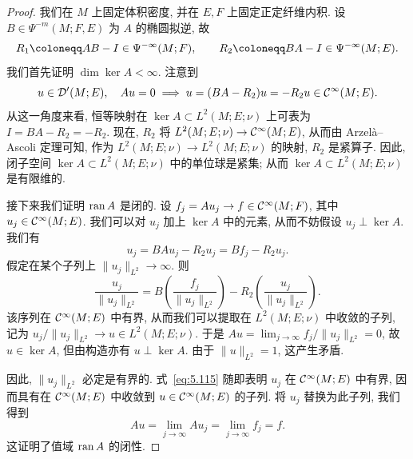 \begin{proof}
我们在 $M$ 上固定体积密度, 并在 $E, F$ 上固定正定纤维内积. 设 $B \in \Psi^{-m}(M; F, E)$ 为 $A$ 的椭圆拟逆, 故
\begin{equation}\label{eq:5.113}
    R_1 \defeq A B - I \in \Psi^{-\infty}(M; F), \qquad R_2 \defeq B A - I \in \Psi^{-\infty}(M; E).
\end{equation}
我们首先证明 $\dim\ker A < \infty$. 注意到
\begin{equation}\label{eq:5.114}
    u \in \mathcal{D}'(M; E), \quad A u = 0 \implies u = (B A - R_2) u = -R_2 u \in \mathcal{C}^\infty(M; E).
\end{equation}
从这一角度来看, 恒等映射在 $\ker A \subset L^2(M; E; \nu)$ 上可表为 $I = B A - R_2 = -R_2$. 现在, $R_2$ 将 $L^2(M; E; \nu) \to \mathcal{C}^\infty(M; E)$, 从而由 Arzelà--Ascoli 定理可知, 作为 $L^2(M; E; \nu) \to L^2(M; E; \nu)$ 的映射, $R_2$ 是紧算子. 因此, 闭子空间 $\ker A \subset L^2(M; E; \nu)$ 中的单位球是紧集; 从而 $\ker A \subset L^2(M; E; \nu)$ 是有限维的.

接下来我们证明 $\operatorname{ran} A$ 是闭的. 设 $f_j = A u_j \to f \in \mathcal{C}^\infty(M; F)$, 其中 $u_j \in \mathcal{C}^\infty(M; E)$. 我们可以对 $u_j$ 加上 $\ker A$ 中的元素, 从而不妨假设 $u_j \perp \ker A$. 我们有
\begin{equation}\label{eq:5.115}
    u_j = B A u_j - R_2 u_j = B f_j - R_2 u_j.
\end{equation}
假定在某个子列上 $\|u_j\|_{L^2} \to \infty$. 则
\begin{equation}\label{eq:5.116}
    \frac{u_j}{\|u_j\|_{L^2}} = B\left( \frac{f_j}{\|u_j\|_{L^2}} \right) - R_2\left( \frac{u_j}{\|u_j\|_{L^2}} \right).
\end{equation}
该序列在 $\mathcal{C}^\infty(M; E)$ 中有界, 从而我们可以提取在 $L^2(M; E; \nu)$ 中收敛的子列, 记为 $u_j / \|u_j\|_{L^2} \to u \in L^2(M; E; \nu)$. 于是 $A u = \lim_{j\to\infty} f_j / \|u_j\|_{L^2} = 0$, 故 $u \in \ker A$, 但由构造亦有 $u \perp \ker A$. 由于 $\|u\|_{L^2} = 1$, 这产生矛盾.

因此, $\|u_j\|_{L^2}$ 必定是有界的. 式~\eqref{eq:5.115} 随即表明 $u_j$ 在 $\mathcal{C}^\infty(M; E)$ 中有界, 因而具有在 $\mathcal{C}^\infty(M; E)$ 中收敛到 $u \in \mathcal{C}^\infty(M; E)$ 的子列. 将 $u_j$ 替换为此子列, 我们得到
\begin{equation}\label{eq:5.117}
    A u = \lim_{j\to\infty} A u_j = \lim_{j\to\infty} f_j = f.
\end{equation}
这证明了值域 $\operatorname{ran} A$ 的闭性.


\end{proof}
